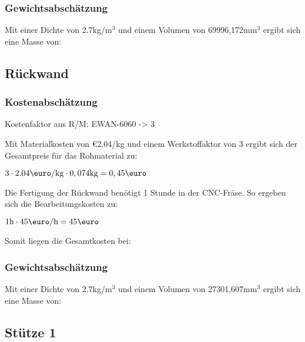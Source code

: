 \documentclass[10pt, a4paper]{article}
\begin{document}
\subsubsection{Gewichtsabschätzung}
Mit einer Dichte von 2.7kg/m$^3$ und einem Volumen von 69996,172mm$^3$ ergibt sich eine Masse von:
\begin{flushright}
\end{flushright}

\newpage
\subsection{Rückwand}
\begin{figure}[h]
  \centering
  \vspace{-10pt}
\end{figure}
\subsubsection{Kostenabschätzung}
\begin{center}
  Kostenfaktor aus R/M: EWAN-6060 -> 3
\end{center}
Mit Materialkosten von \euro2.04/kg und einem Werkstoffaktor von 3 ergibt sich der Gesamtpreis für das Rohmaterial zu: 
\begin{center}
    $3 \cdot 2.04\text{\euro/kg} \cdot 0,074\text{kg} = 0,45\text{\euro}$
\end{center}
Die Fertigung der Rückwand benötigt 1 Stunde in der CNC-Fräse. So ergeben sich die Bearbeitungskosten zu:
\begin{center}
  $1\text{h} \cdot 45\text{\euro/h}= 45\text{\euro}$
\end{center}
Somit liegen die Gesamtkosten bei:
\begin{flushright}
\end{flushright}
\subsubsection{Gewichtsabschätzung}
Mit einer Dichte von 2.7kg/m$^3$ und einem Volumen von 27301,607mm$^3$ ergibt sich eine Masse von:
\begin{flushright}
\end{flushright}

\newpage
\subsection{Stütze 1}
\begin{figure}[h]
  \centering
  \vspace{-10pt}
\end{figure}
\end{document}
